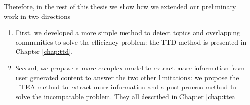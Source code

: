 Therefore, in the rest of this thesis we show how we extended our preliminary work in two directions:

\begin{enumerate}
 \item First, we developed a more simple method to detect topics and overlapping communities to solve the efficiency problem: the TTD method is presented in Chapter \ref{chap:ttd}.
  \item Second, we propose a more complex model to extract more information from user generated content to answer the two other limitations: we propose the TTEA method to extract more information and a post-process method to solve the incomparable problem. They all described in Chapter \ref{chap:ttea}
\end{enumerate}
 
